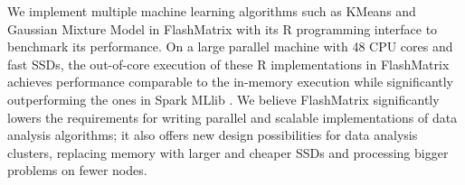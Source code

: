 
We implement multiple machine learning algorithms such as KMeans \cite{kmeans}
and Gaussian Mixture Model \cite{gmm} in FlashMatrix with its R programming
interface to benchmark its performance. On a large parallel machine with 48
CPU cores and fast SSDs, the out-of-core execution of these R implementations
in FlashMatrix achieves performance comparable to the in-memory execution
while significantly outperforming the ones in Spark MLlib \cite{spark}.
We believe FlashMatrix significantly lowers the requirements for writing parallel
and scalable implementations of data analysis algorithms; it also offers new
design possibilities for data analysis clusters, replacing memory with larger
and cheaper SSDs and processing bigger problems on fewer nodes.
